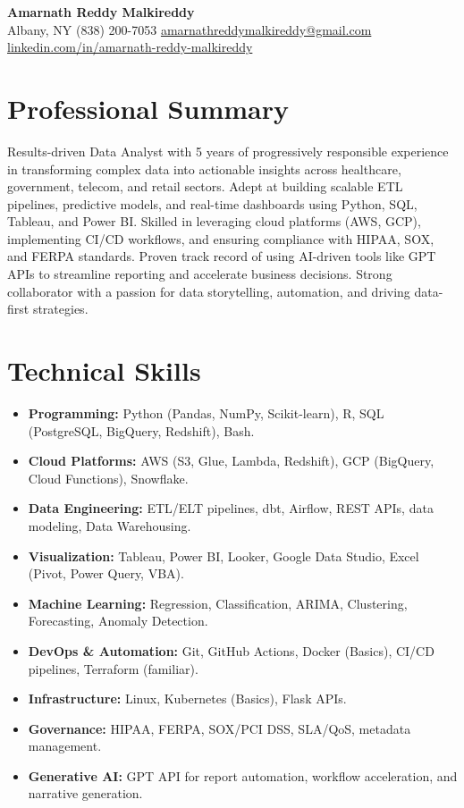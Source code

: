 \documentclass[11pt,a4paper]{article}
\newcommand{\sectionneed}{\Needspace{3\baselineskip}}
\newcommand{\afterheader}{\vspace{-6pt}}
\begin{document}
\begin{center}
    {\LARGE\bfseries Amarnath Reddy Malkireddy}\\[-2pt]
    Albany, NY \textbullet{} (838) 200-7053 \textbullet{}
    \href{mailto:mamarnathreddy49@gmail.com}{amarnathreddymalkireddy@gmail.com} 
    \href{https://www.linkedin.com/in/amarnath-reddy-malkireddy}{linkedin.com/in/amarnath-reddy-malkireddy}
\end{center}
\afterheader

\sectionneed
\section*{Professional Summary}
Results-driven Data Analyst with 5 years of progressively responsible experience in transforming complex data into actionable insights across healthcare, government, telecom, and retail sectors. Adept at building scalable ETL pipelines, predictive models, and real-time dashboards using Python, SQL, Tableau, and Power BI. Skilled in leveraging cloud platforms (AWS, GCP), implementing CI/CD workflows, and ensuring compliance with HIPAA, SOX, and FERPA standards. Proven track record of using AI-driven tools like GPT APIs to streamline reporting and accelerate business decisions. Strong collaborator with a passion for data storytelling, automation, and driving data-first strategies.


\sectionneed
\section*{Technical Skills}
\begin{itemize}
    \item \textbf{Programming:} Python (Pandas, NumPy, Scikit-learn), R, SQL (PostgreSQL, BigQuery, Redshift), Bash.
    \item \textbf{Cloud Platforms:} AWS (S3, Glue, Lambda, Redshift), GCP (BigQuery, Cloud Functions), Snowflake.
    \item \textbf{Data Engineering:} ETL/ELT pipelines, dbt, Airflow, REST APIs, data modeling, Data Warehousing.
    \item \textbf{Visualization:} Tableau, Power BI, Looker, Google Data Studio, Excel (Pivot, Power Query, VBA).
    \item \textbf{Machine Learning:} Regression, Classification, ARIMA, Clustering, Forecasting, Anomaly Detection.
    \item \textbf{DevOps \& Automation:} Git, GitHub Actions, Docker (Basics), CI/CD pipelines, Terraform (familiar).
    \item \textbf{Infrastructure:} Linux, Kubernetes (Basics), Flask APIs.
    \item \textbf{Governance:} HIPAA, FERPA, SOX/PCI DSS, SLA/QoS, metadata management.
    \item \textbf{Generative AI:} GPT API for report automation, workflow acceleration, and narrative generation.
\end{itemize}
\end{document}
